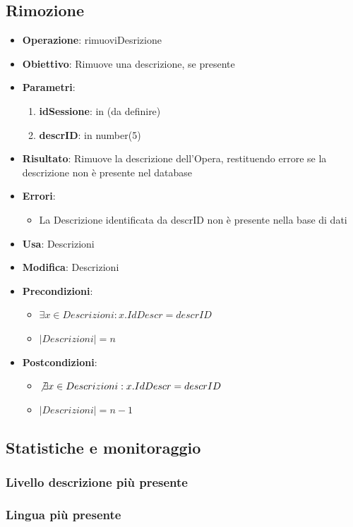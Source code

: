 \documentclass[a4paper,11pt]{article}
\begin{document}
\subsection{Rimozione}
\begin{itemize}
	\item \textbf{Operazione}: rimuoviDesrizione
	\item \textbf{Obiettivo}: Rimuove una descrizione, se presente
	\item \textbf{Parametri}:
	\begin{enumerate}
		\item \textbf{idSessione}: in (da definire)
		\item \textbf{descrID}: in number(5)
	\end{enumerate}
	\item \textbf{Risultato}: Rimuove la descrizione dell'Opera, restituendo errore se la descrizione non è presente nel database
	\item \textbf{Errori}: 
	\begin{itemize}
		\item La Descrizione identificata da descrID non è presente nella base di dati
	\end{itemize}
	\item \textbf{Usa}: Descrizioni
	\item \textbf{Modifica}: Descrizioni
	\item \textbf{Precondizioni}:
	\begin{itemize}
		\item $\exists x \in Descrizioni : x.IdDescr = descrID$
		\item $|Descrizioni| = n$
	\end{itemize}
	\item \textbf{Postcondizioni}:
	\begin{itemize}
		\item $\not\exists x \in Descrizioni : x.IdDescr = descrID$
		\item $|Descrizioni| = n - 1$
	\end{itemize}
\end{itemize}

\subsection{Statistiche e monitoraggio}
\subsubsection{Livello descrizione più presente}
\subsubsection{Lingua più presente}
\end{document}
